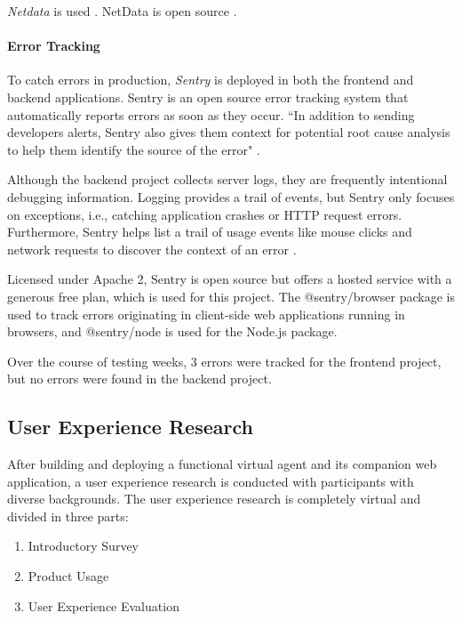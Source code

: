 \documentclass{article}
\begin{document}
\emph{Netdata} is used \cite{noauthor_netdata_nodate}. NetData is open source \cite{noauthor_netdata/netdata_2020}.

\paragraph{Error Tracking}

To catch errors in production, \emph{Sentry} is deployed in both the frontend and backend applications. Sentry is an open source error tracking system \cite{noauthor_sentry_nodate} that automatically reports errors as soon as they occur. ``In addition to sending developers alerts, Sentry also gives them context for potential root cause analysis to help them identify the source of the error" \cite{noauthor_sentry_nodate-1}.

Although the backend project collects server logs, they are frequently intentional debugging information. Logging provides a trail of events, but Sentry only focuses on exceptions, i.e., catching application crashes or HTTP request errors. Furthermore, Sentry helps list a trail of usage events like mouse clicks and network requests to discover the context of an error \cite{noauthor_sentry_nodate-2}.

Licensed under Apache 2, Sentry is open source but offers a hosted service with a generous free plan, which is used for this project. The @sentry/browser package is used to track errors originating in client-side web applications running in browsers, and @sentry/node is used for the Node.js package.

Over the course of testing weeks, 3 errors were tracked for the frontend project, but no errors were found in the backend project.

\subsection{User Experience Research}

After building and deploying a functional virtual agent and its companion web application, a user experience research is conducted with participants with diverse backgrounds. The user experience research is completely virtual and divided in three parts:

\begin{enumerate}
	\item Introductory Survey
	\item Product Usage
	\item User Experience Evaluation
\end{enumerate}
\end{document}
